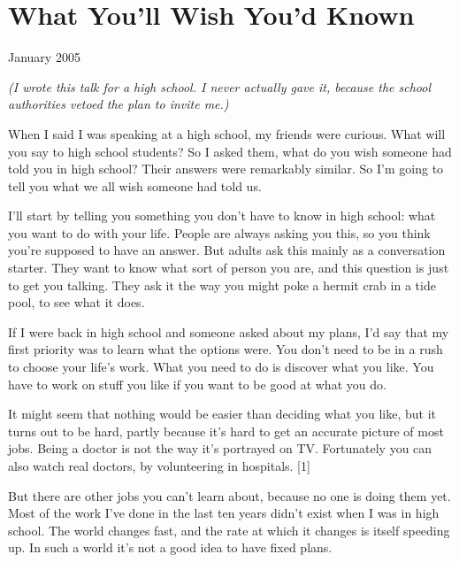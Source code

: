 \chapter{What You'll Wish You'd Known}


            
              
                

January 2005

\emph{(I wrote this talk for a high school. I never actually gave
                    it, because the school authorities vetoed the plan to invite
                    me.)}

When I said I was speaking at a high school, my
                  friends were curious. What will you say to high school
                  students? So I asked them, what do you wish someone had told
                  you in high school? Their answers were remarkably similar. So
                  I'm going to tell you what we all wish someone had told us.

I'll
                  start by telling you something you don't have to know in high
                  school: what you want to do with your life. People are always
                  asking you this, so you think you're supposed to have an
                  answer. But adults ask this mainly as a conversation starter.
                  They want to know what sort of person you are, and this
                  question is just to get you talking. They ask it the way you
                  might poke a hermit crab in a tide pool, to see what it
                  does.

If I were back in high school and someone
                  asked about my plans, I'd say that my first priority was to
                  learn what the options were. You don't need to be in a rush to
                  choose your life's work. What you need to do is discover what
                  you like. You have to work on stuff you like if you want to be
                  good at what you do.

It might seem that nothing
                  would be easier than deciding what you like, but it turns out
                  to be hard, partly because it's hard to get an accurate
                  picture of most jobs. Being a doctor is not the way it's
                  portrayed on TV. Fortunately you can also watch real doctors,
                  by volunteering in hospitals. [1]

But there are
                  other jobs you can't learn about, because no one is doing them
                  yet. Most of the work I've done in the last ten years didn't
                  exist when I was in high school. The world changes fast, and
                  the rate at which it changes is itself speeding up. In such a
                  world it's not a good idea to have fixed plans.

